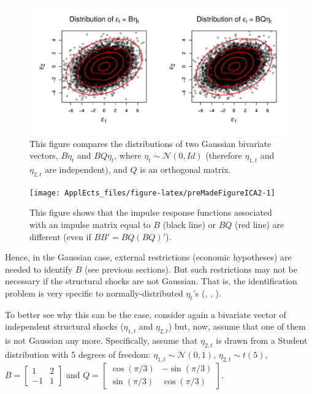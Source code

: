 \documentclass[
  12pt,
]{book}
\theoremstyle{definition}
\theoremstyle{definition}
\theoremstyle{definition}
\theoremstyle{definition}
\theoremstyle{remark}
\begin{document}
\begin{figure}
\includegraphics[width=0.95\linewidth]{images/Figure_A} \caption{This figure compares the distributions of two Gaussian bivariate vectors, $B \eta_t$ and $BQ\eta_t$, where $\eta_{t} \sim \mathcal{N}(0,Id)$ (therefore $\eta_{1,t}$ and $\eta_{2,t}$ are independent), and $Q$  is an orthogonal matrix.}\label{fig:preMadeFigureICA}
\end{figure}

\begin{figure}
\texttt{[image: ApplEcts\_files/figure-latex/preMadeFigureICA2-1]} \caption{This figure shows that the impulse response functions associated with an impulse matrix equal to $B$ (black line) or $BQ$ (red line) are different (even if $BB'=BQ(BQ)'$).}\label{fig:preMadeFigureICA2}
\end{figure}

Hence, in the Gaussian case, external restrictions (economic hypotheses) are needed to identify \(B\) (see previous sections). But such restrictions may not be necessary if the structural shocks are not Gaussian. That is, the identification problem is very specific to normally-distributed \(\eta_t\)'s (\citet{Rigobon_2003}, \citet{NORMANDIN20041217}, \citet{Lanne_Lutkepohl_2008}).

To better see why this can be the case, consider again a bivariate vector of independent structural shocks (\(\eta_{1,t}\) and \(\eta_{2,t}\)) but, now, assume that one of them is not Gaussian any more. Specifically, assume that \(\eta_{2,t}\) is drawn from a Student distribution with 5 degrees of freedom:
\(\eta_{1,t} \sim \mathcal{N}(0,1)\), \(\eta_{2,t} \sim t(5)\),
\(B = \left[\begin{array}{cc} 1 & 2 \\ -1 & 1 \end{array}\right]\) and
\(Q = \left[\begin{array}{cc} \cos(\pi/3) & -\sin(\pi/3) \\ \sin(\pi/3) & \cos(\pi/3) \end{array}\right]\).
\end{document}
